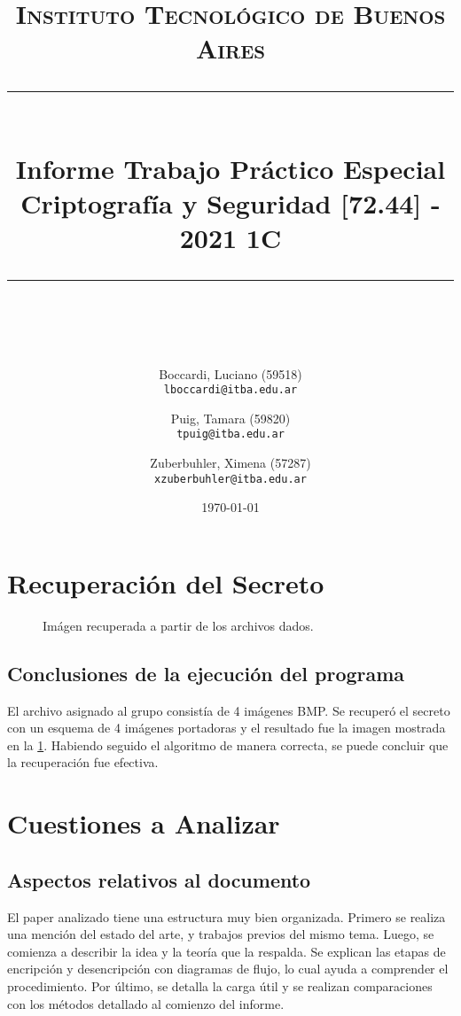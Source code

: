 \documentclass[11pt]{scrartcl} %
\title{	
	\normalfont\normalsize
	\textsc{Instituto Tecnológico de Buenos Aires}\\ %
	\vspace{25pt} %
	\rule{\linewidth}{0.5pt}\\ %
	\vspace{20pt} %
	{\huge Informe Trabajo Práctico Especial}\\ %
	\vspace{25pt} %
	{\huge Criptografía y Seguridad [72.44] - 2021 1C}\\ %
	\vspace{12pt} %
	\rule{\linewidth}{2pt}\\ %
	\vspace{12pt} %
}
\author{
  Boccardi, Luciano (59518)\\
  \texttt{lboccardi@itba.edu.ar}
  \and
  Puig, Tamara (59820)\\
  \texttt{tpuig@itba.edu.ar}
  \and
  Zuberbuhler, Ximena (57287)\\
  \texttt{xzuberbuhler@itba.edu.ar}
}
\date{\normalsize\today} %
\begin{document}
\maketitle %


\newpage

\section{Recuperación del Secreto}

\begin{figure}[h] %
	\centering
	\caption{Imágen recuperada a partir de los archivos dados.}
	\label{secret_image}
\end{figure}


\subsection{Conclusiones de la ejecución del programa}

El archivo asignado al grupo consistía de 4 imágenes BMP. Se recuperó el secreto con un esquema de 4 imágenes portadoras y el resultado fue la imagen mostrada en la \figurename{\ref{secret_image}}. Habiendo seguido el algoritmo de manera correcta, se puede concluir que la recuperación fue efectiva.


\section{Cuestiones a Analizar}

\subsection{Aspectos relativos al documento}

El paper analizado tiene una estructura muy bien organizada. Primero se realiza una mención del estado del arte, y trabajos previos del mismo tema. Luego, se comienza a describir la idea y la teoría que la respalda. Se explican las etapas de encripción y desencripción con diagramas de flujo, lo cual ayuda a comprender el procedimiento. Por último, se detalla la carga útil y se realizan comparaciones con los métodos detallado al comienzo del informe.
\end{document}
